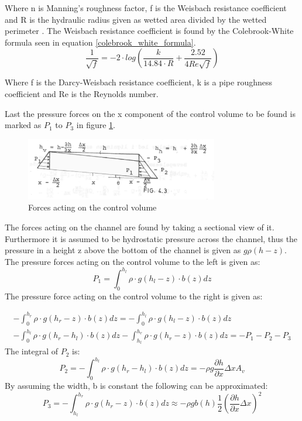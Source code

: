 Where n is Manning's roughness factor, f is the Weisbach resistance coefficient and R is the hydraulic radius given as wetted area divided by the wetted perimeter \cite{stormwatercollectionsystems}.
The Weisbach resistance coefficient is found by the Colebrook-White formula seen in equation \ref{colebrook_white_formula}.
\begin{equation}
\frac{1}{\sqrt{f}} = -2\cdot log \left( \frac{k}{14.84 \cdot R}+ \frac{2.52}{4 Re \sqrt{f}} \right)
\label{colebrook_white_formula}
\end{equation}

Where f is the Darcy-Weisbach resistance coefficient, k is a pipe roughness coefficient and Re is the Reynolds number.

Last the pressure forces on the x component of the control volume to be found is marked as $P_1$ to $P_3$ in figure \ref{fig:forces_on_CV}. 

\begin{figure}[H]
\centering
\includegraphics[width=0.75\textwidth]{report/modeling/pictures/palle_fig.png}
\caption{Forces acting on the control volume }
\label{fig:forces_on_CV}
\end{figure}

The forces acting on the channel are found by taking a sectional view of it. Furthermore it is assumed to be hydrostatic pressure across the channel, thus the pressure in a height z above the bottom of the channel is given as $g\rho(h-z)$.  
The pressure forces acting on the control volume to the left is given as:
\begin{equation}\label{eq:P1}
	P_1 = \int_{0}^{h_l} \rho \cdot g (h_l - z)\cdot b(z) dz
\end{equation}
The pressure force acting on the control volume to the right is given as:

\begin{multline}\label{eq:P2}
	-\int_{0}^{h_r} \rho \cdot g (h_r - z)\cdot b(z)dz = -\int_{0}^{h_l} \rho \cdot g (h_l - z)\cdot b(z)dz \\ -\int_{0}^{h_l} \rho \cdot g (h_r - h_l)\cdot b(z)dz -\int_{h_l}^{h_r} \rho \cdot g (h_r - z)\cdot b(z)dz = -P_1 - P_2 - P_3
\end{multline}
The integral of $P_2$ is: 
\begin{equation}
	P_2 = -\int_{0}^{h_l} \rho \cdot g (h_r - h_l)\cdot b(z)dz = -\rho g \frac{\partial h}{\partial x}\Delta x A_v
\end{equation}
By assuming the width, b is constant the following can be approximated: 
\begin{equation}
	P_3 = -\int_{h_l}^{h_r} \rho \cdot g (h_r - z)\cdot b(z)dz \approx -\rho g b(h) \frac{1}{2}\left(\frac{\partial h}{\partial x}\Delta x\right)^2
\end{equation}	

